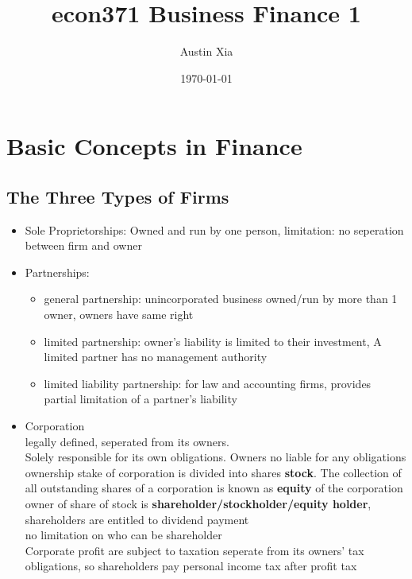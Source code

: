 \documentclass[10pt]{article}
\theoremstyle{break}
\begin{document}
\let\ref\Cref

\title{\bf{econ371 Business Finance 1}}
\date{\today}
\author{Austin Xia}

\maketitle
\newpage
\tableofcontents
\listoffigures
\listoftables
\newpage
\section{Basic Concepts in Finance}
\subsection{The Three Types of Firms}
\begin{itemize}
    \item Sole Proprietorships: Owned and run by one person, limitation: no seperation between firm and owner
    \item Partnerships: \begin{itemize}
        \item general partnership: unincorporated business owned/run by more than 1 owner, owners have same right
        \item limited partnership: owner's liability is limited to their investment, A limited partner has no management authority
        \item limited liability partnership: for law and accounting firms, provides partial limitation of a partner's liability
    \end{itemize}
    \item Corporation \\ legally defined, seperated from its owners.
    \\ Solely responsible for its own obligations. Owners no liable for any obligations
    \\ ownership stake of corporation is divided into shares \textbf{stock}. The collection of all outstanding shares of a corporation is known as \textbf{equity} of the corporation
    \\ owner of share of stock is \textbf{shareholder/stockholder/equity holder}, shareholders are entitled to dividend payment 
    \\ no limitation on who can be shareholder
    \\ Corporate profit are subject to taxation seperate from its owners' tax obligations, so shareholders pay personal income tax after profit tax
\end{itemize}
\end{document}
